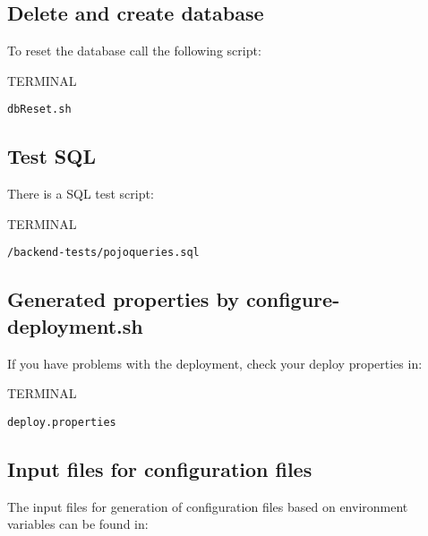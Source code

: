 \documentclass[10pt,a4paper]{article}
\begin{document}
\subsection{Delete and create database}
To reset the database call the following script:

\begin{command}{TERMINAL}

\begin{lstlisting}
dbReset.sh
\end{lstlisting}

\end{command}

\subsection{Test SQL}
There is a SQL test script:

\begin{command}{TERMINAL}

\begin{lstlisting}
/backend-tests/pojoqueries.sql
\end{lstlisting}

\end{command}



\subsection{Generated properties by configure-deployment.sh}
If you have problems with the deployment, check your deploy properties in:

\begin{command}{TERMINAL}

\begin{lstlisting}
deploy.properties
\end{lstlisting}

\end{command}

\subsection{Input files for configuration files}
The input files for generation of configuration files based on environment variables can be found in:
\end{document}
